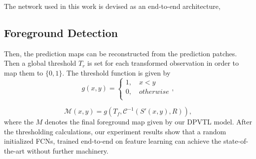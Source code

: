 \documentclass[journal]{IEEEtran}
\newcommand{\reffig}[1]{Fig. \ref{#1}}
\begin{document}
The network used in this work is devised as an end-to-end architecture, 


% 
% 

\subsection{Foreground Detection}
Then, the prediction maps can be reconstructed from the prediction patches.
%
Then a global threshold $T_r$ is set for each transformed observation in order to map them to $\{0,1\}$. 
%
The threshold function is given by
\begin{equation}
    \label{piecewise_fg}
    g(x,y) =
 \begin{cases}
  1,  \quad x < y       \\
  0,  \quad otherwise   \\
\end{cases},
\end{equation}

\begin{equation}
    \mathcal{M}(x,y) = g(T_f, \mathcal{C}^{-1}(S'(x,y), R)),
\end{equation}
where the $M$ denotes the final foreground map given by our DPVTL model.
After the thresholding calculations, our experiment results show that a random initialized FCNs, trained end-to-end on feature learning can achieve the state-of-the-art without further machinery. 
\end{document}
